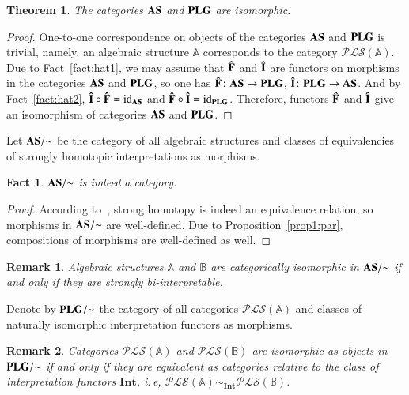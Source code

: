 \documentclass[12pt]{article}
\newtheorem{theorem}{Theorem}
\newtheorem{fact}{Fact}
\newtheorem{remark}{Remark}
\theoremstyle{definition}
\def\MA{{\mathbb{A}}}
\def\MB{{\mathbb{B}}}
\def\Int{{\mathbf{Int}}}
\def\PLS{{\mathcal{PLS}}}
\def\id{{\mathrm{id}}}
\begin{document}
\begin{theorem}\label{TH}
The categories ${\bf AS}$ and ${\bf PLG}$ are isomorphic.
\end{theorem}

\begin{proof}
One-to-one correspondence on objects of the categories ${\bf AS}$ and ${\bf PLG}$ is trivial, namely, an algebraic structure $\MA$ corresponds to the category $\PLS(\MA)$. Due to Fact~\ref{fact:hat1}, we may assume that ${\bf \hat F}$ and ${\bf \hat I}$ are functors on morphisms in the categories ${\bf AS}$ and ${\bf PLG}$, so one has ${\bf \hat F}\colon {\bf AS}\to {\bf PLG}$, ${\bf\hat  I}\colon {\bf PLG}\to {\bf AS}$. And by Fact~\ref{fact:hat2}, ${\bf \hat I}\circ{\bf \hat F}=\id_{{\bf AS}}$ and  ${\bf \hat F}\circ{\bf \hat I}=\id_{{\bf PLG}}$. Therefore, functors ${\bf \hat F}$ and ${\bf \hat I}$ give an isomorphism of categories ${\bf AS}$ and ${\bf PLG}$.   
\end{proof}

Let ${\bf AS}/{\sim}$ be the category of all algebraic structures and classes of equivalencies of strongly homotopic interpretations as morphisms. 

\begin{fact}
    ${\bf AS}/{\sim}$ is indeed a category.
\end{fact}

\begin{proof}
According to~\cite[Lemma~5]{Th_int1}, strong homotopy is indeed an equivalence relation, so morphisms in ${\bf AS}/{\sim}$ are well-defined. Due to Proposition~\ref{prop1:par}, compositions of morphisms are well-defined as well. 
\end{proof}

\begin{remark}
    Algebraic structures $\MA$ and $\MB$ are categorically isomorphic in ${\bf AS}/{\sim}$ if and only if they are strongly bi-interpretable.
\end{remark}

Denote by ${\bf PLG}/{\sim}$ the category of all categories $\PLS(\MA)$ and classes of naturally isomorphic interpretation functors as morphisms. 

\begin{remark}
    Categories $\PLS(\MA)$ and $\PLS(\MB)$ are isomorphic as objects in ${\bf PLG}/{\sim}$ if and only if they are equivalent as categories relative to the class of interpretation functors $\Int$, i.\,e, $\PLS(\MA)\sim_\Int\PLS(\MB)$.
\end{remark}
\end{document}
